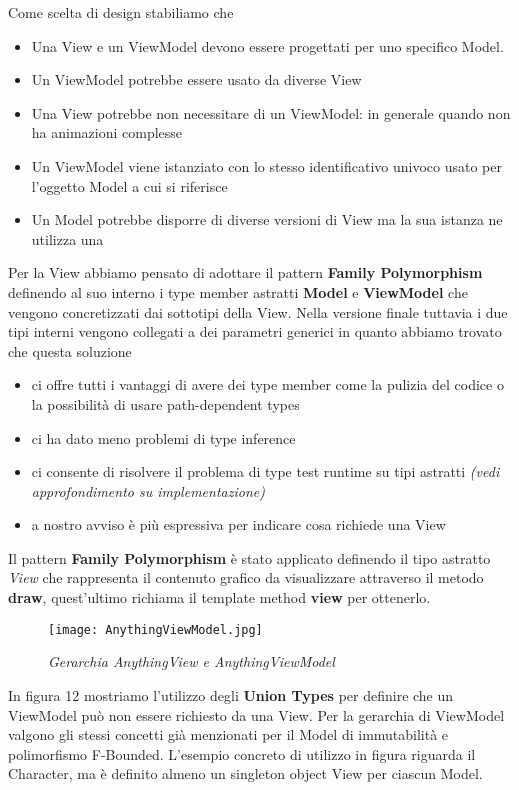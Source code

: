 Come scelta di design stabiliamo che 
\begin{itemize}
    \item Una View e un ViewModel devono essere progettati per uno specifico Model.
    \item Un ViewModel potrebbe essere usato da diverse View
    \item Una View potrebbe non necessitare di un ViewModel: in generale quando non ha animazioni complesse
    \item Un ViewModel viene istanziato con lo stesso identificativo univoco usato per l'oggetto Model a cui si riferisce
    \item Un Model potrebbe disporre di diverse versioni di View ma la sua istanza ne utilizza una
\end{itemize}
Per la View abbiamo pensato di adottare il pattern \textbf{Family Polymorphism} definendo al suo interno i type member astratti \textbf{Model} e \textbf{ViewModel} che vengono concretizzati dai sottotipi della View.
Nella versione finale tuttavia i due tipi interni vengono collegati a dei parametri generici in quanto abbiamo trovato che questa soluzione
\begin{itemize}
    \item ci offre tutti i vantaggi di avere dei type member come la pulizia del codice o la possibilità di usare path-dependent types
    \item ci ha dato meno problemi di type inference 
    \item ci consente di risolvere il problema di type test runtime su tipi astratti \textit{(vedi approfondimento su implementazione)}
    \item a nostro avviso è più espressiva per indicare cosa richiede una View
\end{itemize}

Il pattern \textbf{Family Polymorphism} è stato applicato definendo il tipo astratto \textit{View} che rappresenta il contenuto grafico da visualizzare attraverso il metodo \textbf{draw}, quest'ultimo richiama il template method \textbf{view} per ottenerlo.

\begin{figure}[!hbt]
    \centering
    \texttt{[image: AnythingViewModel.jpg]}
    \caption{\textit{Gerarchia AnythingView e AnythingViewModel}} 
\end{figure}

In figura 12 mostriamo l'utilizzo degli \textbf{Union Types} per definire che un ViewModel può non essere richiesto da una View.
Per la gerarchia di ViewModel valgono gli stessi concetti già menzionati per il Model di immutabilità e polimorfismo F-Bounded.
L'esempio concreto di utilizzo in figura riguarda il Character, ma è definito almeno un singleton object View per ciascun Model.

